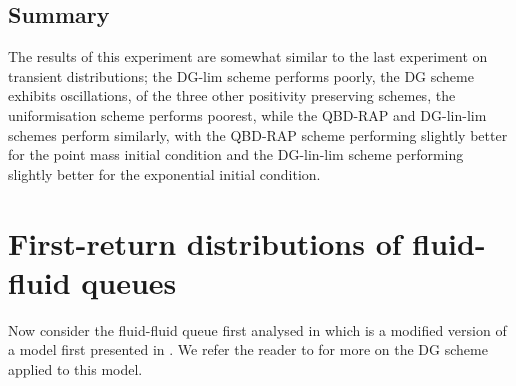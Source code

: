 \subsection*{Summary}
The results of this experiment are somewhat similar to the last experiment on transient distributions; the DG-lim scheme performs poorly, the DG scheme exhibits oscillations, of the three other positivity preserving schemes, the uniformisation scheme performs poorest, while the QBD-RAP and DG-lin-lim schemes perform similarly, with the QBD-RAP scheme performing slightly better for the point mass initial condition and the DG-lin-lim scheme performing slightly better for the exponential initial condition. 

\FloatBarrier
\section{First-return distributions of fluid-fluid queues}\label{sec: ffq num}
Now consider the fluid-fluid queue first analysed in \cite{blnos2022} which is a modified version of a model first presented in \cite{lnp13}. We refer the reader to \cite{blnos2022} for more on the DG scheme applied to this model. 
